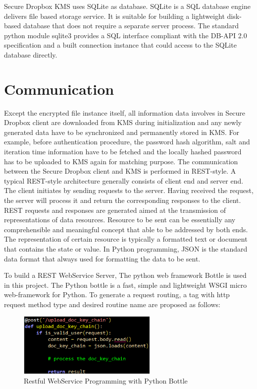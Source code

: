 Secure Dropbox KMS uses SQLite as database. SQLite is a SQL database engine delivers file based storage service. It is suitable for building a lightweight disk-based database that does not require a separate server process. The standard python module sqlite3 provides a SQL interface compliant with the DB-API 2.0 specification and a built connection instance that could access to the SQLite database directly.

\section{Communication}

Except the encrypted file instance itself, all information data involves in Secure Dropbox client are downloaded from KMS during initialization and any newly generated data have to be synchronized and permanently stored in KMS. For example, before authentication procedure, the password hash algorithm, salt and iteration time information have to be fetched and the locally hashed password has to be uploaded to KMS again for matching purpose. The communication between the Secure Dropbox client and KMS is performed in REST-style. A typical REST-style architecture generally consists of client end and server end. The client initiates by sending requests to the server. Having received the request, the server will process it and return the corresponding responses to the client. REST requests and responses are generated aimed at the transmission of representations of data resources. Resource to be sent can be essentially any comprehensible and meaningful concept that able to be addressed by both ends. The representation of certain resource is typically a formatted text or document that contains the state or value. In Python programming, JSON is the standard data format that always used for formatting the data to be sent.

To build a REST WebService Server, The python web framework Bottle is used in this project. The Python bottle is a fast, simple and lightweight WSGI micro web-framework for Python. To generate a request routing, a tag with http request method type and desired routine name are proposed as follows:

\begin{figure}[h]
        \centering
        \includegraphics[width=0.6\textwidth]{figures/Restful_WebService_Programming_with_Bottle.png}
        \caption[Restful WebService Programming] {Restful WebService Programming with Python Bottle}
\end{figure}

